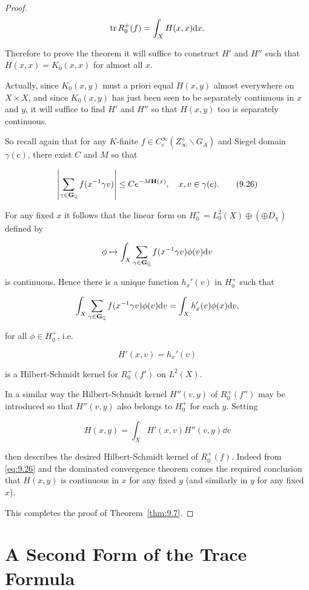 \begin{proof}
\[
\operatorname{tr} R_0^{+}(f) = \int_X H(x, x)\mathrm{d} x.
\]

Therefore to prove the theorem it will suffice to construct $H'$ and $H''$ such that $H(x, x) = K_0(x, x)$ for almost all $x$.

Actually, since $K_0(x,y)$ must a priori equal $H(x,y)$ almost everywhere on $X \times X$, and since $K_0(x,y)$ has just been seen to be separately continuous in $x$ and $y$, it will suffice to find $H'$ and $H''$ so that $H(x,y)$ too is separately continuous.

So recall again that for any $K$-finite $f \in C_c^\infty(Z_\infty^{+} \backslash G_A)$ and Siegel domain $\gamma(c)$, there exist $C$ and $M$ so that

\begin{equation}\label{eq:9.26}
\left|\sum_{\gamma \in \mathbf{G}_{\mathbb{Q}}} f(x^{-1}\gamma v)\right| \leq Ce^{-M\mathbf{H}(x)}, \quad x, v \in \gamma(c).\tag{9.26}
\end{equation}

For any fixed $x$ it follows that the linear form on $H_0^{+} = L_0^2(X) \oplus (\oplus D_\chi)$ defined by

\[
\phi \mapsto \int_X \sum_{\gamma \in \mathbf{G}_{\mathbb{Q}}} f(x^{-1}\gamma v)\phi(v)\mathrm{d} v
\]

is continuous. Hence there is a unique function $h_x'(v)$ in $H_0^{+}$ such that

\[
\int_X \sum_{\gamma \in \mathbf{G}_{\mathbb{Q}}} f(x^{-1}\gamma v)\phi(v)\mathrm{d} v = \int_X h_x'(v)\phi(x)\mathrm{d} v,
\]

for all $\phi \in H_0^{+}$, i.e.

\[
H'(x, v) = h_x'(v)
\]

is a Hilbert-Schmidt kernel for $R_0^{+}(f')$ on $L^2(X)$.

In a similar way the Hilbert-Schmidt kernel $H''(v,y)$ of $R_0^{+}(f'')$ may be introduced so that $H''(v,y)$ also belongs to $H_0^{+}$ for each $y$. Setting

\[
H(x, y) = \int_X H'(x, v)H''(v, y)\dd v
\]

then describes the desired Hilbert-Schmidt kernel of $R_0^{+}(f)$. Indeed from \eqref{eq:9.26} and the dominated convergence theorem comes the required conclusion that $H(x,y)$ is continuous in $x$ for any fixed $y$ (and similarly in $y$ for any fixed $x$).

This completes the proof of Theorem~\ref{thm:9.7}.

\end{proof}

\section{A Second Form of the Trace Formula}\label{sec:9c}

